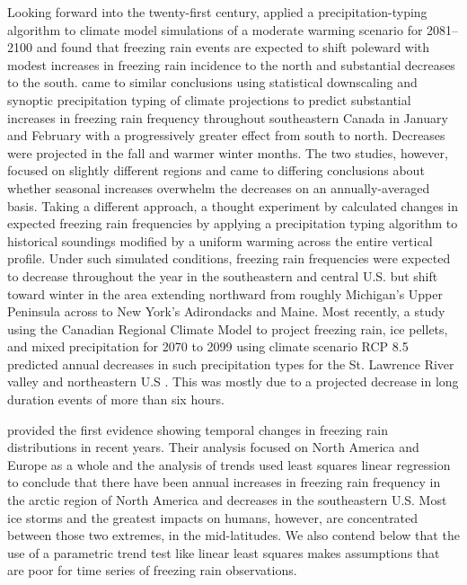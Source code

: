\documentclass[twocol]{ametsoc}
\begin{document}
Looking forward into the twenty-first century, \citet{lambert2011simulated} applied a precipitation-typing algorithm to climate model simulations of a moderate warming scenario for 2081--2100 and found that freezing rain events are expected to shift poleward with modest increases in freezing rain incidence to the north and substantial decreases to the south. \citet{cheng2011possible} came to similar conclusions using statistical downscaling and synoptic precipitation typing of climate projections to predict substantial increases in freezing rain frequency throughout southeastern Canada in January and February with a progressively greater effect from south to north. Decreases were projected in the fall and warmer winter months. The two studies, however, focused on slightly different regions and came to differing conclusions about whether seasonal increases overwhelm the decreases on an annually-averaged basis. Taking a different approach, a thought experiment by \citet{klima2015ice} calculated changes in expected freezing rain frequencies by applying a precipitation typing algorithm to historical soundings modified by a uniform warming across the entire vertical profile. Under such simulated conditions, freezing rain frequencies were expected to decrease throughout the year in the southeastern and central U.S. but shift toward winter in the area extending northward from roughly Michigan's Upper Peninsula across to New York's Adirondacks and Maine. Most recently, a study using the Canadian Regional Climate Model to project freezing rain, ice pellets, and mixed precipitation for 2070 to 2099 using climate scenario RCP 8.5 predicted annual decreases in such precipitation types for the St. Lawrence River valley and northeastern U.S \citep{matte2018mixed}. This was mostly due to a projected decrease in long duration events of more than six hours. 

\citet{groisman2016recent} provided the first evidence showing temporal changes in freezing rain distributions in recent years. Their analysis focused on North America and Europe as a whole and the analysis of trends used least squares linear regression to conclude that there have been annual increases in freezing rain frequency in the arctic region of North America and decreases in the southeastern U.S. Most ice storms and the greatest impacts on humans, however, are concentrated between those two extremes, in the mid-latitudes. We also contend below that the use of a parametric trend test like linear least squares makes assumptions that are poor for time series of freezing rain observations.
\end{document}

